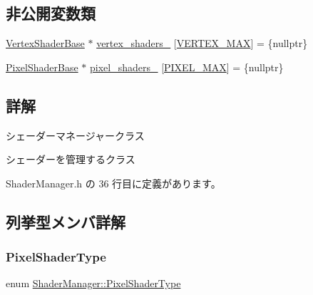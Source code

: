 \subsection*{非公開変数類}
\begin{DoxyCompactItemize}
\item 
\mbox{\hyperlink{class_vertex_shader_base}{Vertex\+Shader\+Base}} $\ast$ \mbox{\hyperlink{class_shader_manager_a56ae173a708111646ae72973f623b036}{vertex\+\_\+shaders\+\_\+}} \mbox{[}\mbox{\hyperlink{class_shader_manager_a9b51e49d70eb3cc58f6d1f3994e8cfbda2a90d8502c5060ffb7b4a7d1c1f0e940}{V\+E\+R\+T\+E\+X\+\_\+\+M\+AX}}\mbox{]} = \{nullptr\}
\item 
\mbox{\hyperlink{class_pixel_shader_base}{Pixel\+Shader\+Base}} $\ast$ \mbox{\hyperlink{class_shader_manager_a236d319ea6fb7a9c7233b942fdf4f464}{pixel\+\_\+shaders\+\_\+}} \mbox{[}\mbox{\hyperlink{class_shader_manager_a7d15d773b3c6a99dd7086c45c8b0be5fa9281ee100f356fae9f9432679705bb9e}{P\+I\+X\+E\+L\+\_\+\+M\+AX}}\mbox{]} = \{nullptr\}
\end{DoxyCompactItemize}


\subsection{詳解}
シェーダーマネージャークラス 

シェーダーを管理するクラス 

 Shader\+Manager.\+h の 36 行目に定義があります。



\subsection{列挙型メンバ詳解}
\mbox{\label{class_shader_manager_a7d15d773b3c6a99dd7086c45c8b0be5f}} 
\subsubsection{\texorpdfstring{Pixel\+Shader\+Type}{PixelShaderType}}
{\footnotesize\ttfamily enum \mbox{\hyperlink{class_shader_manager_a7d15d773b3c6a99dd7086c45c8b0be5f}{Shader\+Manager\+::\+Pixel\+Shader\+Type}}}

